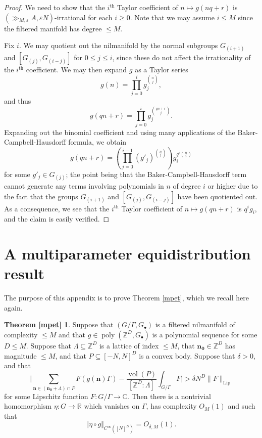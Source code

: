\documentclass[11pt,reqno]{amsart}
\numberwithin{equation}{section}
\theoremstyle{plain}
\theoremstyle{definition}
\newtheorem*{mpet-rpt}{Theorem \ref{mpet}}
\renewcommand{\leq}{\leqslant}
\renewcommand{\geq}{\geqslant}
\newcommand\Z{\mathbb{Z}}
\newcommand\R{\mathbb{R}}
\newcommand\C{\mathbb{C}}
\newcommand\1{{\bf 1}}
\newcommand\2{{\bf 2}}
\newcommand\eps{\varepsilon}
\newcommand\poly{\operatorname{poly}}
\begin{document}
\begin{proof}  We need to show that the $i^{\operatorname{th}}$ Taylor coefficient of $n \mapsto g(nq+r)$ is $(\gg_{M,\eps} A, \eps N)$-irrational for each $i \geq 0$.  Note that we may assume $i \leq M$ since the filtered manifold has degree $\leq M$.

Fix $i$.  We may quotient out the nilmanifold by the normal subgroups $G_{(i+1)}$ and $[G_{(j)},G_{(i-j)}]$ for $0 \leq j \leq i$, since these do not affect the irrationality of the $i^{\operatorname{th}}$ coefficient.  We may then expand $g$ as a Taylor series
$$ g(n) = \prod_{j=0}^i g_j^{\binom{n}{j}},$$
and thus
$$ g(qn+r) = \prod_{j=0}^i g_j^{\binom{qn+r}{j}}.$$
Expanding out the binomial coefficient and using many applications of the Baker-Campbell-Hausdorff formula, we obtain
$$ g(qn+r) = (\prod_{j=0}^{i-1} (g'_j)^{\binom{n}{j}}) g_i^{q^i \binom{n}{i}}$$
for some $g'_j \in G_{(j)}$; the point being that the Baker-Campbell-Hausdorff term cannot generate any terms involving polynomials in $n$ of degree $i$ or higher due to the fact that the groups $G_{(i+1)}$ and $[G_{(j)},G_{(i-j)}]$ have been quotiented out.  As a consequence, we see that the $i^{\operatorname{th}}$ Taylor coefficient of $n \mapsto g(qn+r)$ is $q^i g_i$, and the claim is easily verified.
\end{proof}

\section{A multiparameter equidistribution result}\label{appendix-b}

The purpose of this appendix is to prove Theorem \ref{mpet}, which we recall here again.

\begin{mpet-rpt}
Suppose that $(G/\Gamma, G_{\bullet})$ is a filtered nilmanifold of complexity $\leq M$ and that $g \in \poly(\Z^D, G_{\bullet})$ is a polynomial sequence for some $D \leq M$. Suppose that $\Lambda \subseteq \Z^D$ is a lattice of index $\leq M$, that $\mathbf{n_0} \in \Z^D$ has magnitude $\leq M$, and that $P \subseteq [-N,N]^D$ is a convex body. Suppose that $\delta > 0$, and that 
$$ \big| \sum_{{\mathbf n} \in (\mathbf{n_0}+\Lambda) \cap P} F(g({\mathbf{n}})\Gamma) - \frac{\operatorname{vol}(P)}{[\Z^D:\Lambda]} \int_{G/\Gamma} F \big| > \delta N^D \|F\|_{\operatorname{Lip}}$$
for some Lipschitz function $F: G/\Gamma \to \C$.
Then there is a nontrivial homomorphism $\eta : G \rightarrow \R$ which vanishes on $\Gamma$, has complexity $O_M(1)$ and such that 
\[ \Vert \eta \circ g \Vert_{C^{\infty}([N]^D)} = O_{\delta,M}(1).\]
\end{mpet-rpt}
\end{document}
